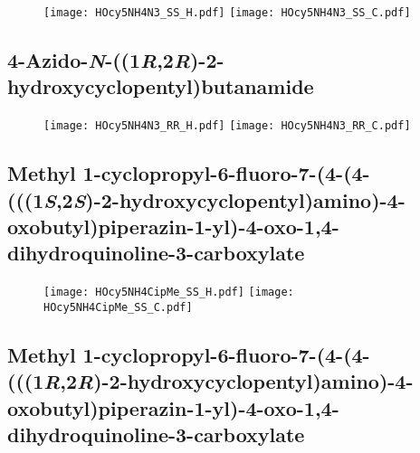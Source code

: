 \begin{figure}[H]
	\centering
		\texttt{[image: HOcy5NH4N3\_SS\_H.pdf]}
		\texttt{[image: HOcy5NH4N3\_SS\_C.pdf]}
\end{figure}

\subsection{4\hyp{}Azido\hyp{}\textit{N}\hyp{}((1\textit{R},2\textit{R})\hyp{}2\hyp{}hydroxycyclopentyl)butanamide } 

\begin{figure}[H]
	\centering
		\texttt{[image: HOcy5NH4N3\_RR\_H.pdf]}
		\texttt{[image: HOcy5NH4N3\_RR\_C.pdf]}
\end{figure}

\subsection{Methyl 1\hyp{}cyclopropyl\hyp{}6\hyp{}fluoro\hyp{}7\hyp{}(4\hyp{}(4\hyp{}(((1\textit{S},2\textit{S})\hyp{}2\hyp{}hydroxycyclopentyl)amino)\allowbreak \hyp{}4\hyp{}oxobutyl)piperazin\hyp{}1\hyp{}yl)\hyp{}4\hyp{}oxo\hyp{}1,4\hyp{}dihydroquinoline\hyp{}3\hyp{}carboxylate }

\begin{figure}[H]
	\centering
		\texttt{[image: HOcy5NH4CipMe\_SS\_H.pdf]}
		\texttt{[image: HOcy5NH4CipMe\_SS\_C.pdf]}
\end{figure}

\subsection{Methyl 1\hyp{}cyclopropyl\hyp{}6\hyp{}fluoro\hyp{}7\hyp{}(4\hyp{}(4\hyp{}(((1\textit{R},2\textit{R})\hyp{}2\hyp{}hydroxycyclopentyl)amino)\allowbreak \hyp{}4\hyp{}oxobutyl)piperazin\hyp{}1\hyp{}yl)\hyp{}4\hyp{}oxo\hyp{}1,4\hyp{}dihydroquinoline\hyp{}3\hyp{}carboxylate }

